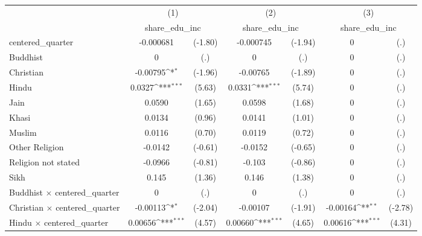 {
\def\sym#1{\ifmmode^{#1}\else\(^{#1}\)\fi}
\begin{tabular}{l*{3}{cc}}
\hline\hline
                    &\multicolumn{2}{c}{(1)}           &\multicolumn{2}{c}{(2)}           &\multicolumn{2}{c}{(3)}           \\
                    &\multicolumn{2}{c}{share\_edu\_inc} &\multicolumn{2}{c}{share\_edu\_inc} &\multicolumn{2}{c}{share\_edu\_inc} \\
\hline
centered\_quarter    &   -0.000681         &     (-1.80)&   -0.000745         &     (-1.94)&           0         &         (.)\\
Buddhist            &           0         &         (.)&           0         &         (.)&           0         &         (.)\\
Christian           &    -0.00795\sym{*}  &     (-1.96)&    -0.00765         &     (-1.89)&           0         &         (.)\\
Hindu               &      0.0327\sym{***}&      (5.63)&      0.0331\sym{***}&      (5.74)&           0         &         (.)\\
Jain                &      0.0590         &      (1.65)&      0.0598         &      (1.68)&           0         &         (.)\\
Khasi               &      0.0134         &      (0.96)&      0.0141         &      (1.01)&           0         &         (.)\\
Muslim              &      0.0116         &      (0.70)&      0.0119         &      (0.72)&           0         &         (.)\\
Other Religion      &     -0.0142         &     (-0.61)&     -0.0152         &     (-0.65)&           0         &         (.)\\
Religion not stated &     -0.0966         &     (-0.81)&      -0.103         &     (-0.86)&           0         &         (.)\\
Sikh                &       0.145         &      (1.36)&       0.146         &      (1.38)&           0         &         (.)\\
Buddhist $\times$ centered\_quarter&           0         &         (.)&           0         &         (.)&           0         &         (.)\\
Christian $\times$ centered\_quarter&    -0.00113\sym{*}  &     (-2.04)&    -0.00107         &     (-1.91)&    -0.00164\sym{**} &     (-2.78)\\
Hindu $\times$ centered\_quarter&     0.00656\sym{***}&      (4.57)&     0.00660\sym{***}&      (4.65)&     0.00616\sym{***}&      (4.31)\\

\end{tabular}}
